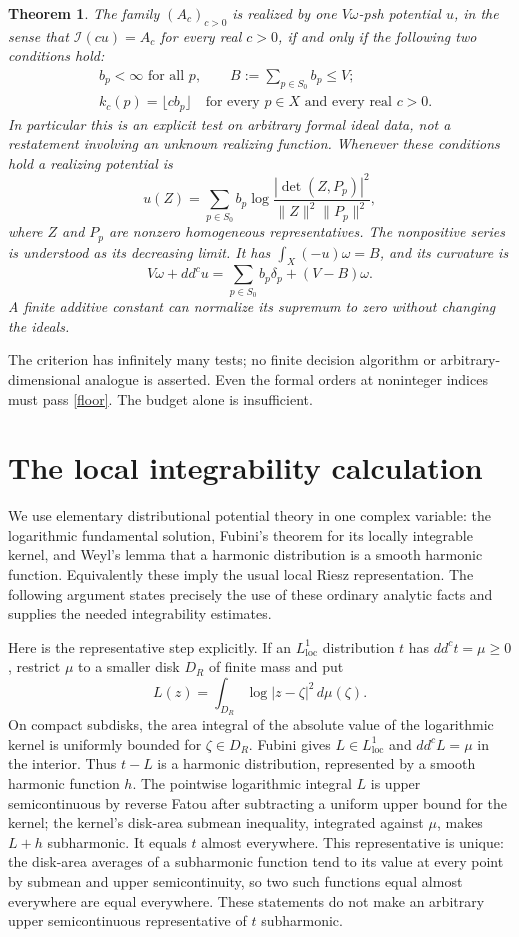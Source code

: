\documentclass[11pt]{article}
\newtheorem{theorem}{Theorem}
\newcommand{\II}{\mathcal I}
\begin{document}
\begin{theorem}\label{main}
The family $(A_c)_{c>0}$ is realized by one $V\omega$-psh potential $u$, in the sense that $\II(cu)=A_c$ for every real $c>0$, if and only if the following two conditions hold:
\begin{align}
 &b_p<\infty\text{ for all }p,
 \qquad B:=\sum_{p\in S_0}b_p\leq V; \label{budget}\\
 &k_c(p)=\lfloor c b_p\rfloor
 \quad\text{for every }p\in X\text{ and every real }c>0. \label{floor}
\end{align}
In particular this is an explicit test on arbitrary formal ideal data, not a restatement involving an unknown realizing function. Whenever these conditions hold a realizing potential is
\[
 u(Z)=\sum_{p\in S_0}b_p\log
 \frac{|\det(Z,P_p)|^2}{\|Z\|^2\|P_p\|^2},
\]
where $Z$ and $P_p$ are nonzero homogeneous representatives. The nonpositive series is understood as its decreasing limit. It has $\int_X(-u)\omega=B$, and its curvature is
\[
 V\omega+dd^cu=\sum_{p\in S_0}b_p\delta_p+(V-B)\omega.
\]
A finite additive constant can normalize its supremum to zero without changing the ideals.
\end{theorem}

The criterion has infinitely many tests; no finite decision algorithm or arbitrary-dimensional analogue is asserted. Even the formal orders at noninteger indices must pass \eqref{floor}. The budget alone is insufficient.

\section{The local integrability calculation}
We use elementary distributional potential theory in one complex variable: the logarithmic fundamental solution, Fubini's theorem for its locally integrable kernel, and Weyl's lemma that a harmonic distribution is a smooth harmonic function. Equivalently these imply the usual local Riesz representation. The following argument states precisely the use of these ordinary analytic facts and supplies the needed integrability estimates.

Here is the representative step explicitly. If an $L^1_{\mathrm{loc}}$ distribution $t$ has $dd^ct=\mu\geq0$, restrict $\mu$ to a smaller disk $D_R$ of finite mass and put
\[
 L(z)=\int_{D_R}\log|z-\zeta|^2\,d\mu(\zeta).
\]
On compact subdisks, the area integral of the absolute value of the logarithmic kernel is uniformly bounded for $\zeta\in D_R$. Fubini gives $L\in L^1_{\mathrm{loc}}$ and $dd^cL=\mu$ in the interior. Thus $t-L$ is a harmonic distribution, represented by a smooth harmonic function $h$. The pointwise logarithmic integral $L$ is upper semicontinuous by reverse Fatou after subtracting a uniform upper bound for the kernel; the kernel's disk-area submean inequality, integrated against $\mu$, makes $L+h$ subharmonic. It equals $t$ almost everywhere. This representative is unique: the disk-area averages of a subharmonic function tend to its value at every point by submean and upper semicontinuity, so two such functions equal almost everywhere are equal everywhere. These statements do not make an arbitrary upper semicontinuous representative of $t$ subharmonic.
\end{document}
